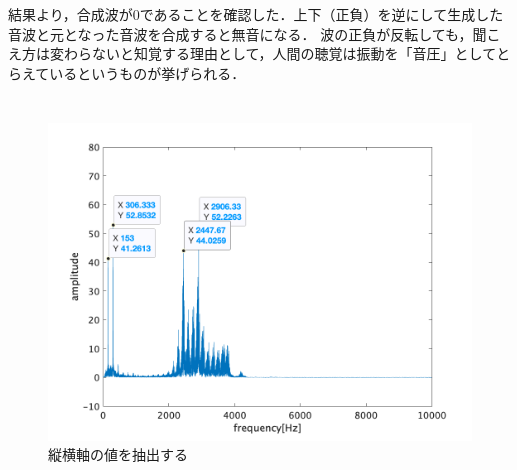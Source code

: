 \consideration
結果より，合成波が\(0\)であることを確認した．上下（正負）を逆にして生成した音波と元となった音波を合成すると無音になる．
波の正負が反転しても，聞こえ方は変わらないと知覚する理由として，人間の聴覚は振動を「音圧」としてとらえているというものが挙げられる．
\section{\kadaicc}\label{sec:\kadaicc}
\purpose

\begin{figure}
    \vspace{-2cm}
    \includegraphics[keepaspectratio,width=.3\textwidth]{../../Figures/03_00_ex.png}
    \caption{縦横軸の値を抽出する}
    \label{fig:縦横軸の値を抽出する}
    \vspace{-2cm}
\end{figure}

